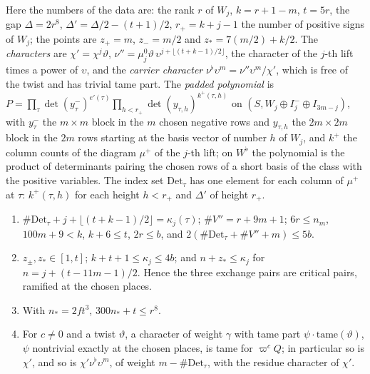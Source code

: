 Here the numbers of the data are: the rank $r$ of $W_j$, $k=r+1-m$, $t=5r$, the gap $\Delta=2r^8$, $\Delta'=\Delta/2-(t+1)/2$, $r_+=k+j-1$ the number of positive signs of $W_j$; the points are $z_+=m$, $z_-=m/2$ and
$z_*=7(m/2)+k/2$. The \emph{characters} are $\chi'=\chi^j\vartheta$, $\nu''=\mu^0_j\vartheta\,\upsilon^{j+\lfloor(t+k-1)/2\rfloor}$, the character of the $j$-th lift times a power of $\upsilon$, and the \emph{carrier character}
$\nu^\flat\upsilon^m=\nu''\upsilon^m/\chi'$, which is free of the twist and has trivial tame part. The \emph{padded polynomial} is $P=\prod_\tau\det(y^-_\tau)^{e'(\tau)}\prod_{h<r_+}\det(y_{\tau,h})^{k^+(\tau,h)}$ on $(S,W_j\oplus I_j^-\oplus I_{3m-j})$, with
$y^-_\tau$ the $m\times m$ block in the $m$ chosen negative rows and $y_{\tau,h}$ the $2m\times2m$ block in the $2m$ rows starting at the basis vector of number $h$ of $W_j$, and $k^+$ the column counts of the diagram
$\mu^+$ of the $j$-th lift; on $W^\flat$ the polynomial is the product of determinants pairing the chosen rows of a short basis of the class with the positive variables. The index set $\mathrm{Det}_\tau$ has one
element for each column of $\mu^+$ at $\tau$: $k^+(\tau,h)$ for each height $h<r_+$ and $\Delta'$ of height $r_+$.

\begin{lemma}\label{lem:exchange-numerics}
\begin{enumerate}[label=\textup{(\alph*)}]
\item $\#\mathrm{Det}_\tau+j+\lfloor(t+k-1)/2\rfloor=\kappa_j(\tau)$; $\#V''=r+9m+1$; $6r\le n_m$, $100m+9<k$, $k+6\le t$, $2r\le b$, and $2(\#\mathrm{Det}_\tau+\#V''+m)\le5b$.
\item $z_\pm,z_*\in[1,t]$; $k+t+1\le\kappa_j\le4b$; and $n+z_*\le\kappa_j$ for $n=j+(t-11m-1)/2$. Hence the three exchange pairs are critical pairs, ramified at the chosen places.
\item With $n_*=2ft^3$, $300n_*+t\le r^8$.
\item For $c\ne0$ and a twist $\vartheta$, a character of weight $\gamma$ with tame part $\psi\cdot\mathrm{tame}(\vartheta)$, $\psi$ nontrivial exactly at the chosen places, is tame for $\varpi^cQ$; in particular so is $\chi'$, and so is $\chi'\nu^\flat\upsilon^m$, of
weight $m-\#\mathrm{Det}_\tau$, with the residue character of $\chi'$.
\end{enumerate}
\end{lemma}

